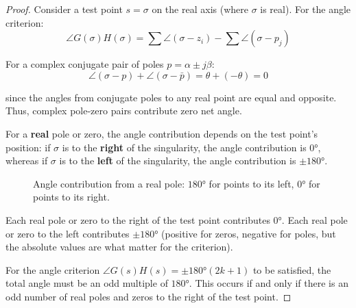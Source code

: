 \begin{proof}
Consider a test point $s = \sigma$ on the real axis (where $\sigma$ is real). For the angle criterion:
\[
\angle G(\sigma)H(\sigma) = \sum \angle(\sigma - z_i) - \sum \angle(\sigma - p_j)
\]

For a complex conjugate pair of poles $p = \alpha \pm j\beta$:
\[
\angle(\sigma - p) + \angle(\sigma - \bar{p}) = \theta + (-\theta) = 0
\]

since the angles from conjugate poles to any real point are equal and opposite. Thus, complex pole-zero pairs contribute zero net angle.

For a \textbf{real} pole or zero, the angle contribution depends on the test point's position: if $\sigma$ is to the \textbf{right} of the singularity, the angle contribution is $0°$, whereas if $\sigma$ is to the \textbf{left} of the singularity, the angle contribution is $\pm 180°$.

\begin{figure}[H]
\centering
{}
\caption{Angle contribution from a real pole: $180°$ for points to its left, $0°$ for points to its right.}
\label{fig:real_axis_angle}
\end{figure}

Each real pole or zero to the right of the test point contributes $0°$. Each real pole or zero to the left contributes $\pm 180°$ (positive for zeros, negative for poles, but the absolute values are what matter for the criterion).

For the angle criterion $\angle G(s)H(s) = \pm 180°(2k+1)$ to be satisfied, the total angle must be an odd multiple of $180°$. This occurs if and only if there is an odd number of real poles and zeros to the right of the test point.
\end{proof}

